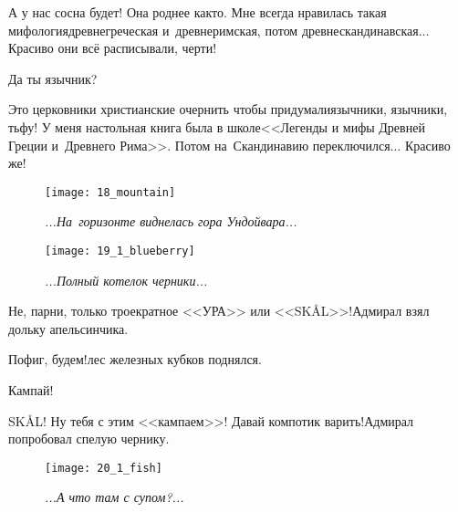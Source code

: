 \diagdash А у нас сосна будет! Она роднее как\sdash то. Мне всегда нравилась такая мифология\mdash древнегреческая и~древнеримская, потом древнескандинавская$\ldots$ Красиво они всё расписывали, черти!

\diagdash Да ты язычник?

\diagdash Это церковники христианские очернить чтобы придумали\mdash язычники, язычники, тьфу! У меня настольная книга была в школе\mdash <<Легенды и мифы Древней Греции и~Древнего Рима>>\cite{Кун}. Потом на~Скандинавию переключился$\ldots$ Красиво же!

\newpage

\begin{figure}[h]
	\centering
	\texttt{[image: 18\_mountain]}
	\caption{\small\textit{...На~горизонте виднелась гора Ундойвара...}}
\end{figure}

\begin{wrapfigure}[11]{r}{0.45\textwidth}
	\centering
	\texttt{[image: 19\_1\_blueberry]}
	\caption{\small\textit{...Полный котелок черники...}}
\end{wrapfigure}

\newpage

\diagdash Не, парни, только троекратное <<УРА>> или <<SKÅL>>!\mdash Адмирал взял дольку апельсинчика.


\diagdash Пофиг, будем!\mdash лес железных кубков поднялся.

\diagdash Кампай!

\diagdash SKÅL! Ну тебя с этим <<кампаем>>! Давай компотик варить!\mdash Адмирал попробовал спелую чернику.

\newpage

\begin{figure}[h]
	\centering
	\texttt{[image: 20\_1\_fish]}
	\caption{\small\textit{...А что там с супом?...}}
\end{figure}

\newpage

